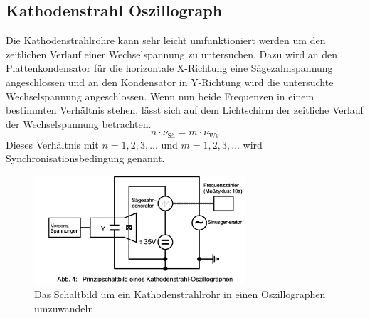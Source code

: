 \subsection{Kathodenstrahl Oszillograph}
Die Kathodenstrahlröhre kann sehr leicht umfunktioniert werden um den zeitlichen Verlauf einer Wechselspannung zu untersuchen.
Dazu wird an den Plattenkondensator für die horizontale X-Richtung eine Sägezahnspannung angeschlossen und an den Kondensator in Y-Richtung wird die untersuchte Wechselspannung angeschlossen.
Wenn nun beide Frequenzen in einem bestimmten Verhältnis stehen, lässt sich auf dem Lichtschirm der zeitliche Verlauf der Wechselspannung betrachten.
\begin{equation}
    n\cdot \nu_{\text{Sä}} = m\cdot \nu_{\text{We}}
    \label{eqn:freq}
\end{equation}
Dieses Verhältnis mit $n = 1,2,3,...$ und $m = 1,2,3,...$ wird Synchronisationsbedingung genannt.
\begin{figure}
    \centering
    \includegraphics[width=0.7\textwidth]{bilder/Prinzipschaltbild.png}
    \caption{Das Schaltbild um ein Kathodenstrahlrohr in einen Oszillographen umzuwandeln}
\end{figure}
